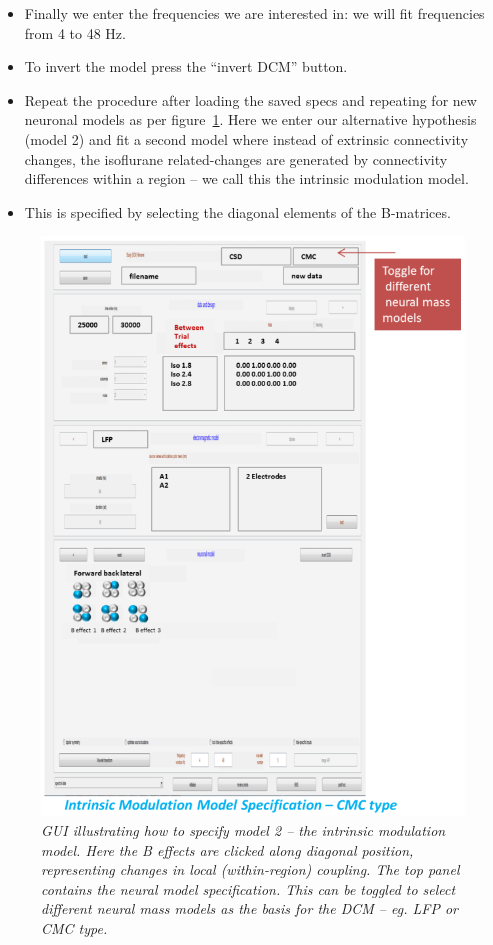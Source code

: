 \begin{itemize}
\item Finally we enter the frequencies we are interested in: we will fit frequencies from 4 to 48 Hz. 
\item To invert the model press the ``invert DCM'' button.
\item Repeat the procedure after loading the saved specs and repeating for new neuronal models as per figure~\ref{dcm_ssr:fig2}. Here we enter our alternative hypothesis (model 2) and fit a second model where instead of extrinsic connectivity changes, the isoflurane related-changes are generated by connectivity differences within a region – we call this the intrinsic modulation model.
\item This is specified by selecting the diagonal elements of the B-matrices.
\end{itemize}

\begin{figure}
\begin{center}
\includegraphics[width=140mm]{dcm_csd/dcm_csd_fig2}
\caption{\em GUI illustrating how to specify model 2 -- the intrinsic modulation model. Here the B effects are clicked along diagonal position, representing changes in local (within-region) coupling. The top panel contains the neural model specification. This can be toggled to select different neural mass models as the basis for the DCM -- eg. LFP or CMC type. 
 \label{dcm_ssr:fig2}}
\end{center}
\end{figure}

